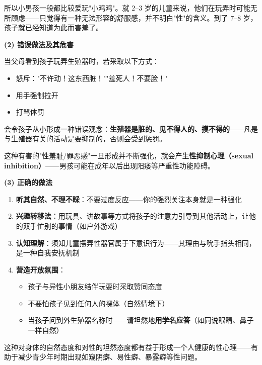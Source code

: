 \begin{enumerate}
所以小男孩一般都比较爱玩"小鸡鸡"。就 $2$--$3$ 岁的儿童来说，他们在玩弄时可能无所顾虑——只觉得有一种无法形容的舒服感，并不明白"性"的含义。到了 $7$--$8$ 岁，孩子就已经知道为此而害羞了。

\vspace{0.3em}
\noindent\textbf{(2) 错误做法及其危害}

当父母看到孩子玩弄生殖器时，若采取以下方式：
\begin{itemize}
	\item 怒斥："不许动！这东西脏！""羞死人！不要脸！"
	\item 用手强制拉开
	\item 打骂体罚
\end{itemize}

会令孩子从小形成一种错误观念：\textbf{生殖器是脏的、见不得人的、摸不得的}——凡是与生殖器有关的活动是要抑制的，否则会受到惩罚。

这种有害的"性羞耻/罪恶感"一旦形成并不断强化，就会产生\textbf{性抑制心理（sexual inhibition）}——男孩可能在成年以后出现阳痿等严重性功能障碍。

\vspace{0.3em}
\noindent\textbf{(3) 正确的做法}

\begin{enumerate}
	\item \textbf{听其自然、不理不睬}：不要过度反应——你的强烈关注本身就是一种强化

	\vspace{0.3em}
	\item \textbf{兴趣转移法}：用玩具、讲故事等方式将孩子的注意力引导到其他活动上，让他的双手忙别的事情（如户外游戏）

	\vspace{0.3em}
	\item \textbf{认知理解}：须知儿童摆弄性器官属于下意识行为——其理由与吮手指头相同，是一种自我安抚机制

	\vspace{0.3em}
	\item \textbf{营造开放氛围}：
	\begin{itemize}
		\item 孩子与异性小朋友结伴玩耍时采取赞同态度
		\item 不要怕孩子见到任何人的裸体（自然情境下）
		\item 当孩子问到外生殖器名称时——请坦然地\textbf{用学名应答}（如同说眼睛、鼻子一样自然）
	\end{itemize}
\end{enumerate}

这种对身体的自然态度和对性的坦然态度都有益于形成一个人健康的性心理——有助于减少青少年时期出现如窥阴癖、易性癖、暴露癖等性问题。


\end{enumerate}
